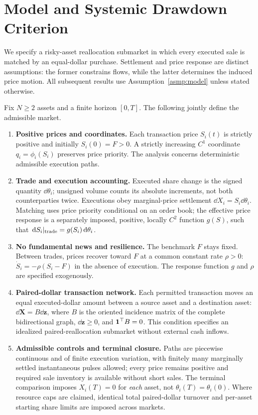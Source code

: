\documentclass[review,hidelinks,onefignum,onetabnum]{siamonline250211}
\begin{document}
\section{Model and Systemic Drawdown Criterion}\label{sec:micro}\label{sec:model}
We specify a risky-asset reallocation submarket in which every executed sale is matched by an equal-dollar purchase. Settlement and price response are distinct assumptions: the former constrains flows, while the latter determines the induced price motion. All subsequent results use Assumption~\ref{asmp:model} unless stated otherwise.

\begin{assumption}\label{asmp:model}
Fix $N\ge2$ assets and a finite horizon $[0,T]$. The following jointly define the admissible market.
\begin{enumerate}[label=\textup{(M\arabic*)},leftmargin=2.9em,itemsep=0.20em]
\item \textbf{Positive prices and coordinates.} Each transaction price $S_i(t)$ is strictly positive and initially $S_i(0)=F>0$. A strictly increasing $C^1$ coordinate $q_i=\phi_i(S_i)$ preserves price priority. The analysis concerns deterministic admissible execution paths.
\item \textbf{Trade and execution accounting.} Executed share change is the signed quantity $\dd\theta_i$; unsigned volume counts its absolute increments, not both counterparties twice. Executions obey marginal-price settlement $\dd X_i=S_i\dd\theta_i$. Matching uses price priority conditional on an order book; the effective price response is a separately imposed, positive, locally $C^2$ function $g(S)$, such that $\,\mathrm{d} S_i|_{\rm trade}=g(S_i)\,\mathrm{d}\theta_i$.
\item \textbf{No fundamental news and resilience.} The benchmark $F$ stays fixed. Between trades, prices recover toward $F$ at a common constant rate $\rho>0$: $\dot S_i=-\rho(S_i-F)$ in the absence of execution. The response function $g$ and $\rho$ are specified exogenously.
\item \textbf{Paired-dollar transaction network.} Each permitted transaction moves an equal executed-dollar amount between a source asset and a destination asset: $\dd\bm X=B\dd\bm z$, where $B$ is the oriented incidence matrix of the complete bidirectional graph, $\dd\bm z\ge0$, and $\mathbf{1}^\top B=0$. This condition specifies an idealized paired-reallocation submarket without external cash inflows.
\item \textbf{Admissible controls and terminal closure.} Paths are piecewise continuous and of finite execution variation, with finitely many marginally settled instantaneous pulses allowed; every price remains positive and required sale inventory is available without short sales. The terminal comparison imposes $X_i(T)=0$ for \emph{each} asset, not $\theta_i(T)=\theta_i(0)$. Where resource caps are claimed, identical total paired-dollar turnover and per-asset starting share limits are imposed across markets.
\end{enumerate}
\end{assumption}
\end{document}

